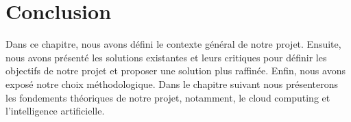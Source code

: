 \section*{Conclusion}
Dans ce chapitre, nous avons défini le contexte général de notre projet. Ensuite, nous avons présenté les solutions existantes et leurs critiques pour définir les objectifs de notre projet et proposer une solution plus raffinée. Enfin, nous avons exposé notre choix méthodologique. Dans le chapitre suivant nous présenterons les fondements théoriques de notre projet, notamment, le cloud computing et l’intelligence artificielle.

